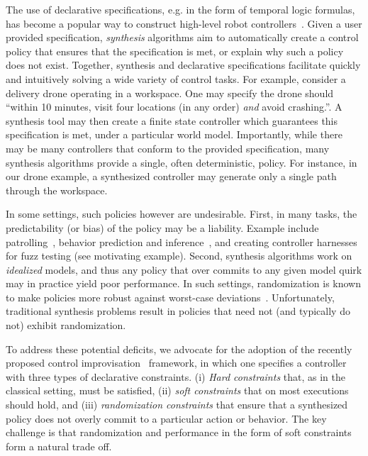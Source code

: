 The use of declarative specifications, e.g. in the form of temporal logic formulas, has become a popular way to construct high-level robot controllers~\cite{DBLP:conf/iros/HorowitzWM14, DBLP:conf/rss/WongEK14, DBLP:conf/iros/HeLKV17, DBLP:conf/icra/FuATP16, DBLP:conf/icra/HeWKV19, DBLP:journals/arobots/MoarrefK20, DBLP:conf/icra/KantarosM0P20}.
Given a user provided specification, \emph{synthesis} algorithms aim
to automatically create a control policy that ensures that the
specification is met, or explain why such a policy does not
exist. Together, synthesis and declarative specifications facilitate
quickly and intuitively solving a wide variety of control tasks.  For
example, consider a delivery drone operating in a workspace. One may
specify the drone should ``within 10 minutes, visit four locations (in any
order) \emph{and} avoid crashing.''. A synthesis tool may then create a
finite state controller which guarantees this specification is met,
under a particular world model.
Importantly, while there may be many controllers that conform to the
provided specification, many synthesis algorithms provide a
single, often deterministic, policy.  For instance, in our drone
example, a synthesized controller may generate only a single path
through the workspace.

In some settings, such policies however are undesirable.  First, in
many tasks, the predictability (or bias) of the policy may be a
liability.  Example include
patrolling~\cite{DBLP:journals/ior/AlpernMP11}, behavior prediction
and inference~\cite{DBLP:conf/cav/Vazquez-Chanlatte20}, and creating
controller harnesses for fuzz testing (see motivating
example). Second, synthesis algorithms work on \emph{idealized}
models, and thus any policy that over commits to any given model quirk
may in practice yield poor performance. In such settings,
randomization is known to make policies more robust against worst-case
deviations~\cite{mceThesis, maxEntAnswer}. Unfortunately, traditional
synthesis problems result in policies that need not (and typically do
not) exhibit randomization.

To address these potential deficits, we advocate for the adoption of
the recently proposed control
improvisation~\cite{DBLP:conf/cav/FremontS18,DBLP:conf/fsttcs/FremontDSW15}
framework, in which one specifies a controller with three types of
declarative constraints. (i) \emph{Hard constraints} that, as in the
classical setting, must be satisfied, (ii) \emph{soft constraints} that
on most executions should hold, and (iii) \emph{randomization
constraints} that ensure that a synthesized policy does not overly
commit to a particular action or behavior. 
The key challenge is that randomization and performance in the form of soft constraints form a natural trade off.

